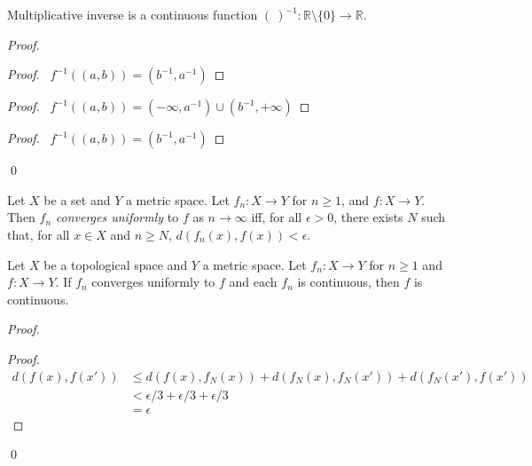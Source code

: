 \begin{lm}
  Multiplicative inverse is a continuous function $(\ )^{-1} : \mathbb{R}
  \setminus \{ 0 \} \rightarrow \mathbb{R}$.
\end{lm}

\begin{proof}
  \pf
  \begin{proof}
    \pf\ $f^{-1}((a, b)) = (b^{-1}, a^{-1})$
  \end{proof}
  \begin{proof}
    \pf\ $f^{-1}((a, b)) = (-\infty, a^{-1}) \cup (b^{-1}, + \infty)$
  \end{proof}
  \begin{proof}
    \pf\ $f^{-1}((a, b)) = (b^{-1}, a^{-1})$
  \end{proof}
  \qed
\end{proof}

\begin{df}
  Let $X$ be a set and $Y$ a metric space. Let $f_n : X \rightarrow Y$ for $n
  \geq 1$, and $f : X \rightarrow Y$. Then $f_n$ \emph{converges uniformly}
  to
  $f$ as $n \rightarrow \infty$ iff, for all $\epsilon > 0$, there exists $N$
  such that, for all $x \in X$ and $n \geq N$, $d(f_n(x), f(x)) < \epsilon$.
\end{df}

\begin{thm}
  Let $X$ be a topological space and $Y$ a metric space. Let $f_n : X
  \rightarrow Y$ for $n \geq 1$ and $f : X \rightarrow Y$. If $f_n$ converges
  uniformly to $f$ and each $f_n$ is continuous, then $f$ is continuous.
\end{thm}

\begin{proof}
  \pf
  \begin{proof}
    \pf
    \begin{align*}
      d(f(x), f(x')) & \leq d(f(x), f_N(x)) + d(f_N(x), f_N(x')) + d(f_N(x'),
      f(x')) \\
      & < \epsilon / 3 + \epsilon / 3 + \epsilon / 3 \\
      & = \epsilon
    \end{align*}
  \end{proof}
  \qed
\end{proof}

